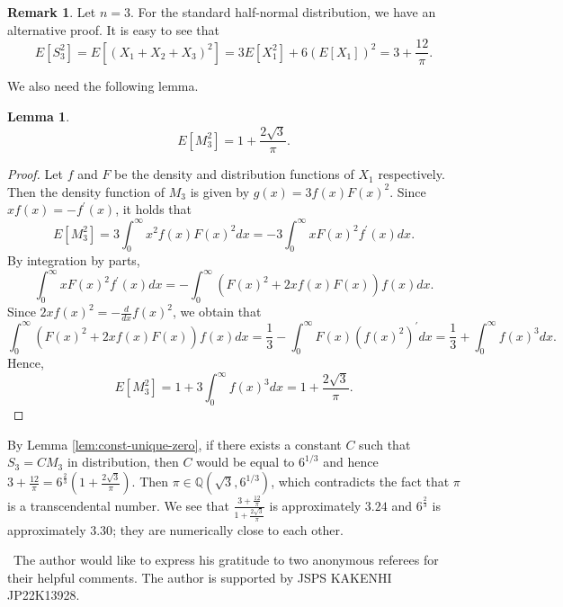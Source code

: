 \documentclass[a4paper, reqno, 11pt]{amsart}
\newtheorem{Lem}[Thm]{Lemma}
\theoremstyle{definition}
\newtheorem{Rem}[Thm]{Remark}
\begin{document}
\begin{Rem}
Let $n=3$. 
For the standard half-normal distribution, we have an alternative proof. 
It is easy to see that 
\[ E\left[S_3^2 \right] = E[(X_1 + X_2 + X_3)^2] = 3 E[X_1^2] + 6 \left(E[X_1] \right)^2 = 3 + \frac{12}{\pi}. \] 

We also need the following lemma. 
\begin{Lem}
\[ E\left[M_3^2 \right] = 1 + \frac{2\sqrt{3}}{\pi}.  \]
\end{Lem}

\begin{proof}
Let $f$ and $F$ be the density and distribution functions of $X_1$ respectively. 
Then the density function of $M_3$ is given by $g(x) = 3 f(x) F(x)^2$. 
Since $x f(x) = -f^{\prime}(x)$, it holds that 
\[ E\left[M_3^2 \right] = 3 \int_0^{\infty} x^2 f(x) F(x)^2 dx  = -3 \int_0^{\infty} x F(x)^2 f^{\prime}(x) dx. \]
By integration by parts, 
\[ \int_0^{\infty} x F(x)^2 f^{\prime}(x) dx = - \int_0^{\infty} (F(x)^2 + 2x f(x) F(x)) f(x) dx.  \]
Since $2x f(x)^2 = - \frac{d}{dx} f(x)^2$, we obtain that 
\[ \int_0^{\infty} (F(x)^2 + 2x f(x) F(x)) f(x) dx = \frac{1}{3} - \int_0^{\infty} F(x) (f(x)^2)^{\prime} dx = \frac{1}{3} + \int_0^{\infty} f(x)^3 dx.  \]
Hence, 
\[ E\left[M_3^2 \right] = 1 + 3 \int_0^{\infty} f(x)^3 dx = 1 + \frac{2\sqrt{3}}{\pi}. \]
\end{proof}


By Lemma \ref{lem:const-unique-zero}, 
if there exists a constant $C$ such that $S_3 = CM_3$ in distribution, 
then $C$ would be equal to $6^{1/3}$ and hence $3 + \frac{12}{\pi} = 6^{\frac{2}{3}} \left(1 + \frac{2\sqrt{3}}{\pi} \right)$. 
Then $\pi \in \mathbb{Q}\left(\sqrt{3}, 6^{1/3}\right)$, which contradicts the fact that $\pi$ is a transcendental  number. 
We see that $\frac{3 + \frac{12}{\pi}}{1 + \frac{2\sqrt{3}}{\pi}}$ is approximately $3.24$ and $6^{\frac{2}{3}}$ is approximately $3.30$; they are numerically close to each other. \\
\end{Rem}



 \ The author would like to express his gratitude to two anonymous referees for their helpful comments.  
The author is supported by JSPS KAKENHI JP22K13928. \\



\end{document}
